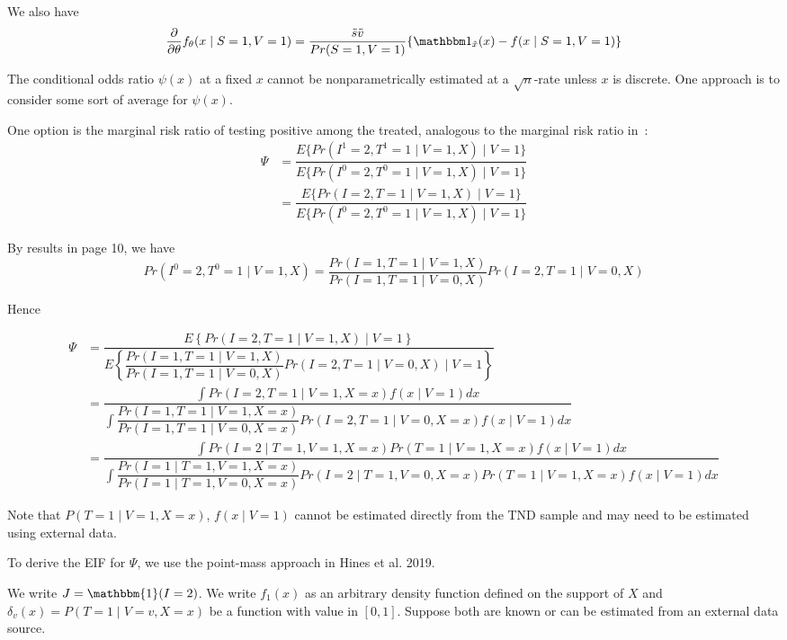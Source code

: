 \documentclass{article}
\begin{document}
We also have
$$\dfrac{\partial}{\partial\theta}f_\theta(x\mid S=1, V=1) = \dfrac{\tilde s \tilde v}{Pr(S=1, V=1)}\{\mathbbm 1_{\tilde x}(x)-f(x\mid S=1, V=1)\}$$



\newpage
The conditional odds ratio $\psi(x)$ at a fixed $x$ cannot be nonparametrically estimated at a $\sqrt n$-rate unless $x$ is discrete. One approach is to consider some sort of average for $\psi(x)$.


One option is the marginal risk ratio of testing positive among the treated, analogous to the marginal risk ratio in~\citet{schnitzer2022estimands}:
\begin{align*}
    \Psi &= \dfrac{E\{Pr(I^1=2, T^1=1\mid V=1, X)\mid V=1\}}{E\{Pr(I^0=2, T^0=1\mid V=1, X)\mid V=1\}}\\
    &=\dfrac{E\{Pr(I=2, T=1\mid V=1, X)\mid V=1\}}{E\{Pr(I^0=2, T^0=1\mid V=1, X)\mid V=1\}}
\end{align*}

By results in page 10, we have
$$Pr(I^0=2, T^0=1\mid V=1, X)=\dfrac{Pr(I=1, T=1\mid V=1, X)}{Pr(I=1, T=1\mid V=0, X)}Pr(I=2, T=1\mid V=0, X)$$


Hence 

\begin{align*}
    \Psi &= \dfrac{E\left\{Pr(I=2, T=1\mid V=1, X)\mid V=1\right\}}{E\left\{\dfrac{Pr(I=1, T=1\mid V=1, X)}{Pr(I=1, T=1\mid V=0, X)}Pr(I=2, T=1\mid V=0, X)\mid V=1\right\}}\\
    &= \dfrac{\int Pr(I=2, T=1\mid V=1, X=x)f(x\mid V=1)dx}{\int \dfrac{Pr(I=1, T=1\mid V=1, X=x)}{Pr(I=1, T=1\mid V=0, X=x)}Pr(I=2, T=1\mid V=0, X=x)f(x\mid V=1)dx}\\
    &=  \dfrac{\int Pr(I=2\mid  T=1, V=1, X=x)Pr(T=1\mid V=1, X=x)f(x\mid V=1)dx}{\int \dfrac{Pr(I=1\mid T=1, V=1, X=x)}{Pr(I=1\mid T=1, V=0, X=x)}Pr(I=2\mid T=1, V=0, X=x)Pr(T=1\mid V=1, X=x)f(x\mid V=1)dx}
\end{align*}

Note that $P(T=1\mid V=1, X=x)$, $f(x\mid V=1)$ cannot be estimated directly from the TND sample and may need to be estimated using external data.


 To derive the EIF for $\Psi$, we use the point-mass approach in Hines et al. 2019.

We write $J=\mathbbm{1}(I=2)$. We write $f_1(x)$ as an arbitrary density function defined on the support of $X$ and $\delta_v(x)=P(T=1\mid V=v, X=x)$ be a function with value in $[0,1]$. Suppose both are known or can be estimated from an external data source. 
\end{document}
